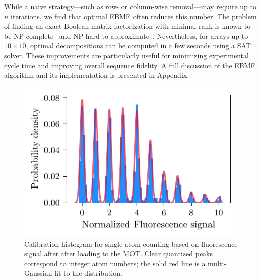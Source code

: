 While a naive strategy—such as row- or column-wise removal—may require up to $n$ iterations, we find that optimal EBMF often reduces this number. The problem of finding an exact Boolean matrix factorization with minimal rank is known to be NP-complete~\cite{orlin_contentment_1977} and NP-hard to approximate~\cite{gruber_inapproximability_2007}. Nevertheless, for arrays up to $10 \times 10$, optimal decompositions can be computed in a few seconds using a SAT solver. These improvements are particularly useful for minimizing experimental cycle time and improving overall sequence fidelity. A full discussion of the EBMF algorithm and its implementation is presented in Appendix.



\begin{figure}
    \centering
    \includegraphics{fig-py/atom-counting.pdf}
    \caption{
        Calibration histogram for single-atom counting based on fluorescence signal after after loading to the MOT. Clear quantized peaks correspond to integer atom numbers; the solid red line is a multi-Gaussian fit to the distribution. 
    }
    \label{fig:spillingadd}
\end{figure}